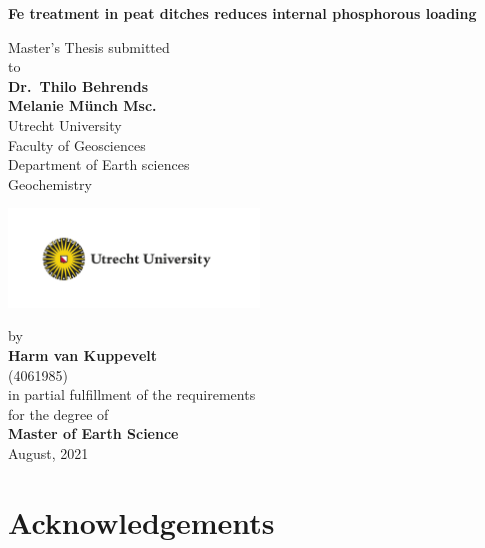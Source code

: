 \documentclass[a4paper,11pt]{article}
\begin{document}
\thispagestyle{empty}
\begin{center}
  {\Large{\bf Fe treatment in peat ditches reduces internal phosphorous loading}} \vspace{0.5cm}

  Master's Thesis submitted \\\vspace{0.5cm}
  to \\\vspace{0.5cm}
  \textbf{Dr.~Thilo Behrends} \\
  \textbf{Melanie Münch Msc.} \\\vspace{0.5cm}
  Utrecht University \\
  Faculty of Geosciences \\
  Department of Earth sciences \\
   Geochemistry \\  \vspace{1cm}

  \includegraphics[width=0.5\textwidth]{UU_logo_EN_CMYK.png}
  
  by \\\vspace{0.5cm}
  \textbf{Harm van Kuppevelt} \\
  (4061985) \\
  
  \medskip
  \medskip
  in partial fulfillment of the requirements \\
  for the degree of \\
  \textbf{Master of Earth Science} \\\vspace{0.5cm}
  August, 2021
  
\end{center}
\newpage
\hypertarget{acknowledgements}{%
\section*{Acknowledgements}\label{acknowledgements}}
\end{document}
